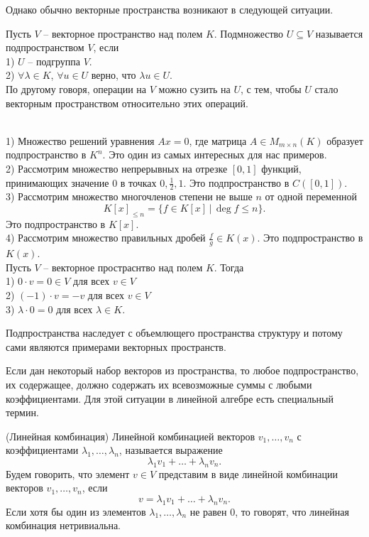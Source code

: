 Однако обычно векторные пространства возникают в следующей ситуации.





\dfn[Подпространство] Пусть $V$ -- векторное пространство над полем $K$. Подмножество $U\subseteq V$ называется подпространством $V$, если\\
1) $U$ -- подгруппа $V$.\\
2) $\forall \lambda \in K$, $\forall u \in U$ верно, что $\lambda u \in U$.\\
По другому говоря,  операции на $V$ можно сузить на $U$, с тем, чтобы $U$ стало векторным пространством относительно этих операций.
\edfn

\exm\\
1) Множество решений уравнения $Ax=0$, где матрица $A \in M_{m \times n}(K)$ образует подпространство в $K^n$. Это один из самых интересных для нас примеров.\\
2) Рассмотрим множество непрерывных на отрезке $[0,1]$ функций, принимающих значение $0$  в точках $0, \frac{1}{2}, 1$. Это подпространство в $C([0,1])$.\\
3) Рассмотрим множество многочленов степени не выше $n$ от одной переменной $$K[x]_{\leq n}=\{ f \in K[x]\,|\, \deg f\leq n\}.$$ Это подпространство в  $K[x]$.\\
4) Рассмотрим множество правильных дробей $\frac{f}{g}\in K(x)$. Это подпространство в $K(x)$.\\

 Пусть $V$ -- векторное простраснтво над полем $K$. Тогда  \\
1) $0\cdot v =0 \in V$ для всех $v\in V$\\
2) $(-1)\cdot v=-v$ для всех $v\in V$\\
3) $\lambda \cdot 0 = 0$ для всех $\lambda\in K$.
\eutv


\rm Подпространства наследует с объемлющего пространства структуру и потому сами являются примерами векторных пространств.
\erm


Если дан некоторый набор векторов из пространства, то любое подпространство, их содержащее, должно содержать их всевозможные суммы с любыми коэффициентами. Для этой ситуации в линейной алгебре есть специальный термин.

\dfn(Линейная комбинация) Линейной комбинацией векторов $v_1,\dots, v_n$ с коэффициентами $\lambda_1, \dots, \lambda_n$, называется выражение
$$\lambda_1 v_1 +\dots + \lambda_n v_n.$$
Будем говорить, что элемент $v\in V$ представим в виде линейной комбинации векторов $v_1,\dots,v_n$, если
$$v=\lambda_1 v_1 +\dots + \lambda_n v_n.$$
Если хотя бы один из элементов $\lambda_1,\dots, \lambda_n $ не равен 0, то говорят, что линейная комбинация нетривиальна.
\edfn



